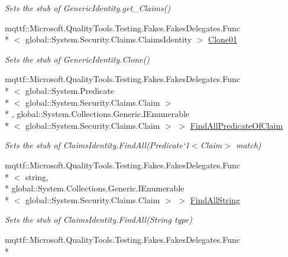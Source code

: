 \begin{DoxyCompactItemize}
\begin{DoxyCompactList}\small\item\em Sets the stub of Generic\-Identity.\-get\-\_\-\-Claims()\end{DoxyCompactList}\item 
mqttf\-::\-Microsoft.\-Quality\-Tools.\-Testing.\-Fakes.\-Fakes\-Delegates.\-Func\\*
$<$ global\-::\-System.\-Security.\-Claims.\-Claims\-Identity $>$ \hyperlink{class_system_1_1_security_1_1_principal_1_1_fakes_1_1_stub_generic_identity_a8baa58d6daef8a0ec155d8e7da5a2340}{Clone01}
\begin{DoxyCompactList}\small\item\em Sets the stub of Generic\-Identity.\-Clone()\end{DoxyCompactList}\item 
mqttf\-::\-Microsoft.\-Quality\-Tools.\-Testing.\-Fakes.\-Fakes\-Delegates.\-Func\\*
$<$ global\-::\-System.\-Predicate\\*
$<$ global\-::\-System.\-Security.\-Claims.\-Claim $>$\\*
, global\-::\-System.\-Collections.\-Generic.\-I\-Enumerable\\*
$<$ global\-::\-System.\-Security.\-Claims.\-Claim $>$ $>$ \hyperlink{class_system_1_1_security_1_1_principal_1_1_fakes_1_1_stub_generic_identity_af4e05bd9f970ace41139219af2bcf64c}{Find\-All\-Predicate\-Of\-Claim}
\begin{DoxyCompactList}\small\item\em Sets the stub of Claims\-Identity.\-Find\-All(Predicate`1$<$Claim$>$ match)\end{DoxyCompactList}\item 
mqttf\-::\-Microsoft.\-Quality\-Tools.\-Testing.\-Fakes.\-Fakes\-Delegates.\-Func\\*
$<$ string, \\*
global\-::\-System.\-Collections.\-Generic.\-I\-Enumerable\\*
$<$ global\-::\-System.\-Security.\-Claims.\-Claim $>$ $>$ \hyperlink{class_system_1_1_security_1_1_principal_1_1_fakes_1_1_stub_generic_identity_a0e563316b344d60bbd6ae75b767b1fc0}{Find\-All\-String}
\begin{DoxyCompactList}\small\item\em Sets the stub of Claims\-Identity.\-Find\-All(\-String type)\end{DoxyCompactList}\item 
mqttf\-::\-Microsoft.\-Quality\-Tools.\-Testing.\-Fakes.\-Fakes\-Delegates.\-Func\\*

\end{DoxyCompactItemize}
